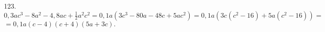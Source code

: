 123. $0,3ac^3-8a^2-4,8ac+\frac{1}{2}a^2c^2=0,1a(3c^3-80a-48c+5ac^2)=0,1a(3c(c^2-16)+5a(c^2-16))=$\\$=0,1a(c-4)(c+4)(5a+3c).$\\
